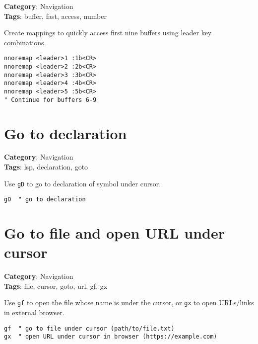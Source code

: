 {{{{{{{{\textbf{Category}: Navigation\\ \textbf{Tags}: buffer, fast, access, number
\vspace{0.5cm}

Create mappings to quickly access first nine buffers using leader key combinations.

\begin{Exa*}{}
\begin{Verbatim}[fontsize=\footnotesize, breaklines, breakanywhere]
nnoremap <leader>1 :1b<CR>
nnoremap <leader>2 :2b<CR>
nnoremap <leader>3 :3b<CR>
nnoremap <leader>4 :4b<CR>
nnoremap <leader>5 :5b<CR>
" Continue for buffers 6-9
\end{Verbatim}
\end{Exa*}

\section{Go to declaration}

\textbf{Category}: Navigation\\ \textbf{Tags}: lsp, declaration, goto
\vspace{0.5cm}

Use {\footnotesize \Verb§gD§} to go to declaration of symbol under cursor.

\begin{Exa*}{}
\begin{Verbatim}[fontsize=\footnotesize, breaklines, breakanywhere]
gD  " go to declaration
\end{Verbatim}
\end{Exa*}

\section{Go to file and open URL under cursor}

\textbf{Category}: Navigation\\ \textbf{Tags}: file, cursor, goto, url, gf, gx
\vspace{0.5cm}

Use {\footnotesize \Verb§gf§} to open the file whose name is under the cursor, or {\footnotesize \Verb§gx§} to open URLs/links in external browser.

\begin{Exa*}{}
\begin{Verbatim}[fontsize=\footnotesize, breaklines, breakanywhere]
gf  " go to file under cursor (path/to/file.txt)
gx  " open URL under cursor in browser (https://example.com)
\end{Verbatim}
\end{Exa*}

}}}}}}}}
